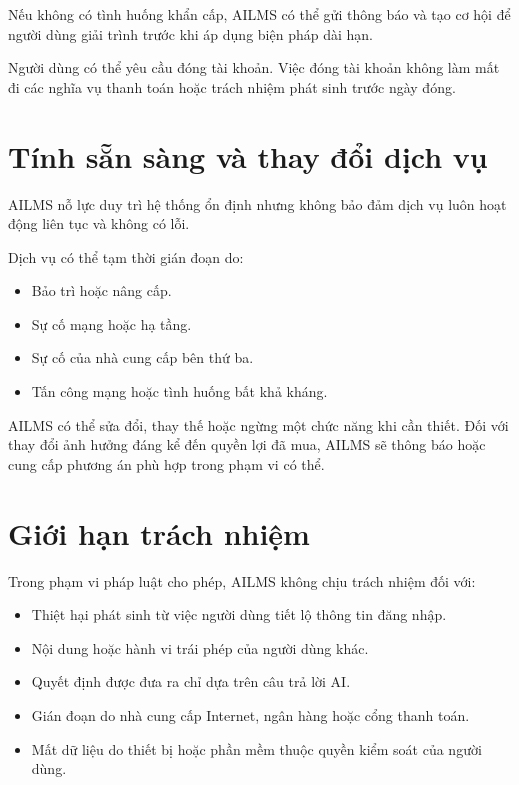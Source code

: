 \documentclass[12pt,a4paper]{article}
\begin{document}
Nếu không có tình huống khẩn cấp, AILMS có thể gửi thông báo và tạo cơ hội
để người dùng giải trình trước khi áp dụng biện pháp dài hạn.

Người dùng có thể yêu cầu đóng tài khoản. Việc đóng tài khoản không làm mất đi
các nghĩa vụ thanh toán hoặc trách nhiệm phát sinh trước ngày đóng.

\section{Tính sẵn sàng và thay đổi dịch vụ}

AILMS nỗ lực duy trì hệ thống ổn định nhưng không bảo đảm dịch vụ
luôn hoạt động liên tục và không có lỗi.

Dịch vụ có thể tạm thời gián đoạn do:

\begin{itemize}
    \item Bảo trì hoặc nâng cấp.
    \item Sự cố mạng hoặc hạ tầng.
    \item Sự cố của nhà cung cấp bên thứ ba.
    \item Tấn công mạng hoặc tình huống bất khả kháng.
\end{itemize}

AILMS có thể sửa đổi, thay thế hoặc ngừng một chức năng khi cần thiết.
Đối với thay đổi ảnh hưởng đáng kể đến quyền lợi đã mua,
AILMS sẽ thông báo hoặc cung cấp phương án phù hợp trong phạm vi có thể.

\section{Giới hạn trách nhiệm}

Trong phạm vi pháp luật cho phép, AILMS không chịu trách nhiệm đối với:

\begin{itemize}
    \item Thiệt hại phát sinh từ việc người dùng tiết lộ thông tin đăng nhập.
    \item Nội dung hoặc hành vi trái phép của người dùng khác.
    \item Quyết định được đưa ra chỉ dựa trên câu trả lời AI.
    \item Gián đoạn do nhà cung cấp Internet, ngân hàng hoặc cổng thanh toán.
    \item Mất dữ liệu do thiết bị hoặc phần mềm thuộc quyền kiểm soát của người dùng.
\end{itemize}
\end{document}

